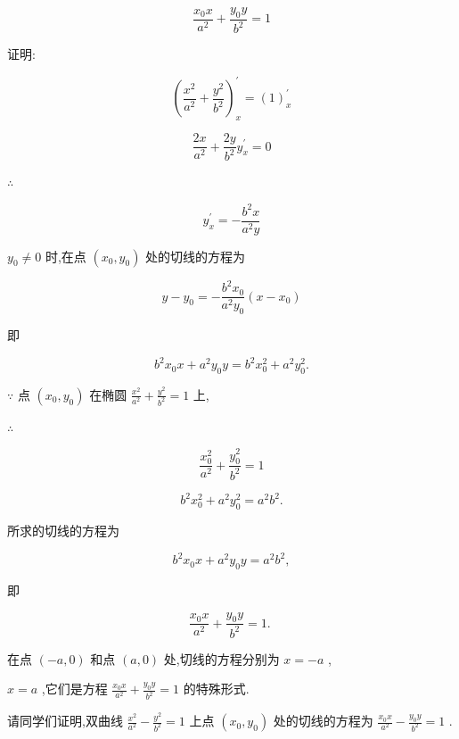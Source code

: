 \documentclass[lang=cn,newtx,10pt,scheme=chinese]{elegantbook}
\begin{document}
\[
\frac{{x}_{0}x}{{a}^{2}} + \frac{{y}_{0}y}{{b}^{2}} = 1
\]

证明:

\[
{\left( \frac{{x}^{2}}{{a}^{2}} + \frac{{y}^{2}}{{b}^{2}}\right) }_{x}^{\prime } = {\left( 1\right) }_{x}^{\prime }
\]

\[
\frac{2x}{{a}^{2}} + \frac{2y}{{b}^{2}}{y}_{x}^{\prime } = 0
\]

\(\therefore\)

\[
{y}_{x}^{\prime } = - \frac{{b}^{2}x}{{a}^{2}y}
\]

\({y}_{0} \neq 0\) 时,在点 \(\left( {{x}_{0},{y}_{0}}\right)\) 处的切线的方程为

\[
y - {y}_{0} = - \frac{{b}^{2}{x}_{0}}{{a}^{2}{y}_{0}}\left( {x - {x}_{0}}\right)
\]

即

\[
{b}^{2}{x}_{0}x + {a}^{2}{y}_{0}y = {b}^{2}{x}_{0}^{2} + {a}^{2}{y}_{0}^{2}.
\]

\(\because\) 点 \(\left( {{x}_{0},{y}_{0}}\right)\) 在椭圆 \(\frac{{x}^{2}}{{a}^{2}} + \frac{{y}^{2}}{{b}^{2}} = 1\) 上,

\(\therefore\)

\[
\frac{{x}_{0}^{2}}{{a}^{2}} + \frac{{y}_{0}^{2}}{{b}^{2}} = 1
\]

\[
{b}^{2}{x}_{0}^{2} + {a}^{2}{y}_{0}^{2} = {a}^{2}{b}^{2}.
\]

所求的切线的方程为

\[
{b}^{2}{x}_{0}x + {a}^{2}{y}_{0}y = {a}^{2}{b}^{2},
\]

即

\[
\frac{{x}_{0}x}{{a}^{2}} + \frac{{y}_{0}y}{{b}^{2}} = 1\text{. }
\]

在点 \(\left( {-a,0}\right)\) 和点 \(\left( {a,0}\right)\) 处,切线的方程分别为 \(x = - a\) ,

\(x = a\) ,它们是方程 \(\frac{{x}_{0}x}{{a}^{2}} + \frac{{y}_{0}y}{{b}^{2}} = 1\) 的特殊形式.

请同学们证明,双曲线 \(\frac{{x}^{2}}{{a}^{2}} - \frac{{y}^{2}}{{b}^{2}} = 1\) 上点 \(\left( {{x}_{0},{y}_{0}}\right)\) 处的切线的方程为 \(\frac{{x}_{0}x}{{a}^{2}} - \frac{{y}_{0}y}{{b}^{2}} = 1\) .
\end{document}
